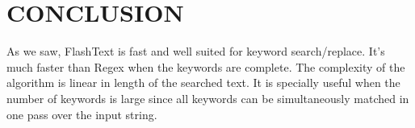 \section*{CONCLUSION}
As we saw, FlashText is fast and well suited for keyword search/replace. It’s much faster than Regex when the keywords are complete. The complexity of the algorithm is linear in length of the searched text. It is specially useful when the number of keywords is large since all keywords can be simultaneously matched in one pass over the input string.
